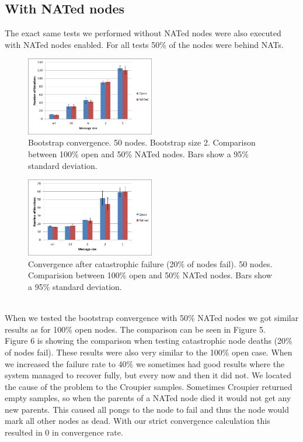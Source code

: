 \documentclass[10pt]{proc}
\begin{document}
\subsection{With NATed nodes}
The exact same tests we performed without NATed nodes were also executed with NATed nodes enabled. For all tests 50\% of the nodes were behind NATs.
\\[10pt]
\begin{figure}[h!]
\centering
\includegraphics[width=0.5\textwidth]{Fig5.png}
\caption{\label{fig.5}Bootstrap convergence. 50 nodes. Bootstrap size 2. Comparison between 100\% open and 50\% NATed nodes. Bars show a 95\% standard deviation.}
\end{figure}
\begin{figure}[h!]
\centering
\includegraphics[width=0.5\textwidth]{Fig6.png}
\caption{\label{fig.6} Convergence after catastrophic failure (20\% of nodes fail). 50 nodes. Comparision between 100\% open and 50\% NATed nodes. Bars show a 95\% standard deviation.}
\end{figure}
\\[10pt]
When we tested the bootstrap convergence with 50\% NATed nodes we got similar results as for 100\% open nodes. The comparison can be seen in Figure 5. 
\\[10pt]
Figure 6 is showing the comparison when testing catastrophic node deaths (20\% of nodes fail). These results were also very similar to the 100\% open case. When we increased the failure rate to 40\% we sometimes had good results where the system managed to recover fully, but every now and then it did not. We located the cause of the problem to the Croupier samples. Sometimes Croupier returned empty samples, so when the parents of a NATed node died it would not get any new parents. This caused all pongs to the node to fail and thus the node would mark all other nodes as dead. With our strict convergence calculation this resulted in 0 in convergence rate.
\end{document}
